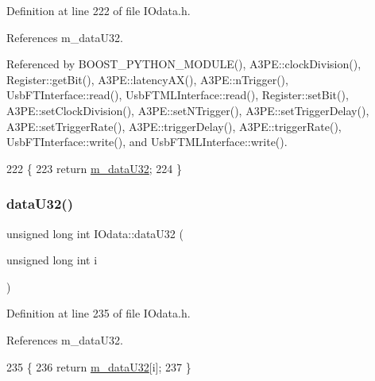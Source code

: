 Definition at line 222 of file I\+Odata.\+h.



References m\+\_\+data\+U32.



Referenced by B\+O\+O\+S\+T\+\_\+\+P\+Y\+T\+H\+O\+N\+\_\+\+M\+O\+D\+U\+L\+E(), A3\+P\+E\+::clock\+Division(), Register\+::get\+Bit(), A3\+P\+E\+::latency\+A\+X(), A3\+P\+E\+::n\+Trigger(), Usb\+F\+T\+Interface\+::read(), Usb\+F\+T\+M\+L\+Interface\+::read(), Register\+::set\+Bit(), A3\+P\+E\+::set\+Clock\+Division(), A3\+P\+E\+::set\+N\+Trigger(), A3\+P\+E\+::set\+Trigger\+Delay(), A3\+P\+E\+::set\+Trigger\+Rate(), A3\+P\+E\+::trigger\+Delay(), A3\+P\+E\+::trigger\+Rate(), Usb\+F\+T\+Interface\+::write(), and Usb\+F\+T\+M\+L\+Interface\+::write().


\begin{DoxyCode}
222                 \{
223     \textcolor{keywordflow}{return} \hyperlink{classIOdata_a247cdaefd87084e3cad1d530d592d99a}{m\_dataU32};
224   \}
\end{DoxyCode}
\mbox{\label{classIOdata_a4ce3bcd54206b1a2149e67cb45dee922}} 
\subsubsection{\texorpdfstring{data\+U32()}{dataU32()}\hspace{0.1cm}{\footnotesize\ttfamily [2/2]}}
{\footnotesize\ttfamily unsigned long int I\+Odata\+::data\+U32 (\begin{DoxyParamCaption}\item[{unsigned long int}]{i }\end{DoxyParamCaption})\hspace{0.3cm}{\ttfamily [inline]}}



Definition at line 235 of file I\+Odata.\+h.



References m\+\_\+data\+U32.


\begin{DoxyCode}
235                                                 \{
236     \textcolor{keywordflow}{return} \hyperlink{classIOdata_a247cdaefd87084e3cad1d530d592d99a}{m\_dataU32}[i];
237   \}
\end{DoxyCode}
\mbox{\label{classIOdata_a75e9c318dbac3a39402179070943d4bc}} 
